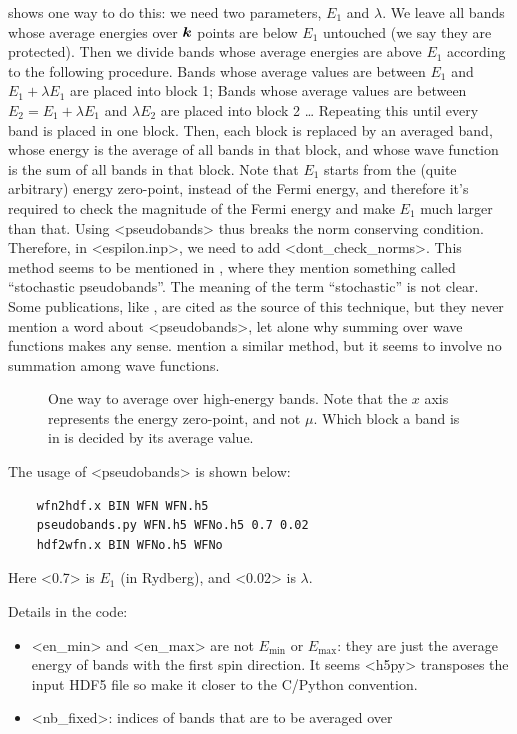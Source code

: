 \documentclass[hyperref, a4paper, 12pt]{report}
\def\texttt#1{<#1>}%
\newcommand{\shortcode}[1]{\texttt{#1}}
\begin{document}
 shows one way to do this: 
we need two parameters, $E_1$ and $\lambda$.
We leave all bands whose average energies over $\vb*{k}$ points 
are below $E_1$ untouched (we say they are protected).
Then we divide bands whose average energies are above $E_1$ 
according to the following procedure.
Bands whose average values are between $E_1$ and $E_1 + \lambda E_1$ 
are placed into block 1;
Bands whose average values are between $E_2 = E_1 + \lambda E_1$ and $\lambda E_2$
are placed into block 2 \dots
Repeating this until every band is placed in one block.
Then, each block is replaced by an averaged band,
whose energy is the average of all bands in that block, 
and whose wave function is the sum of all bands in that block.
Note that $E_1$ starts from the (quite arbitrary) energy zero-point,
instead of the Fermi energy,
and therefore it's required to check 
the magnitude of the Fermi energy 
and make $E_1$ much larger than that.
Using \shortcode{pseudobands} thus breaks the norm conserving condition.
Therefore, in \shortcode{espilon.inp},
we need to add \shortcode{dont_check_norms}.
This method seems to be mentioned in \cite{del2019large,gao2022quasiparticle},
where they mention something called ``stochastic pseudobands''.
The meaning of the term ``stochastic'' is not clear.
Some publications, like \cite{hung2016excitation,del2019static},
are cited as the source of this technique,
but they never mention a word about \shortcode{pseudobands},
let alone why summing over wave functions makes any sense.
\cite{gaospeeding2016} mention a similar method, 
but it seems to involve no summation among wave functions.

\begin{figure}
    \centering
    
    \caption{One way to average over high-energy bands. 
    Note that the $x$ axis represents the energy zero-point, 
    and not $\mu$.
    Which block a band is in is decided by its average value.}
    \label{fig:pseudobands}
\end{figure}

The usage of \shortcode{pseudobands} is shown below:
\begin{lstlisting}
    wfn2hdf.x BIN WFN WFN.h5
    pseudobands.py WFN.h5 WFNo.h5 0.7 0.02
    hdf2wfn.x BIN WFNo.h5 WFNo
\end{lstlisting}
Here \shortcode{0.7} is $E_1$ (in Rydberg), 
and \shortcode{0.02} is $\lambda$.

Details in the code: 
\begin{itemize}
    \item \shortcode{en_min} and \shortcode{en_max} are not $E_{\text{min}}$ or $E_{\text{max}}$:
        they are just the average energy of bands with the first spin direction.
        It seems \shortcode{h5py} transposes the input HDF5 file 
        so make it closer to the C/Python convention.
    \item \shortcode{nb_fixed}: indices of bands that are to be averaged over 
\end{itemize}
\end{document}
